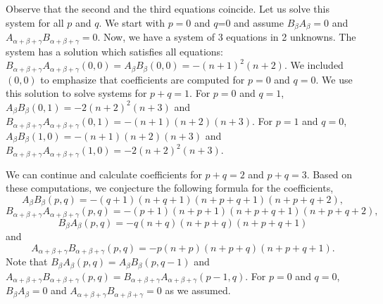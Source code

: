 \documentclass[twoside,a4paper,12pt]{article}
\theoremstyle{definition}
\begin{document}
Observe that the second and the third equations coincide.
Let us solve this system for all $p$ and $q$.
We start with $p=0$ and $q$=0 and assume $B_\beta A_\beta=0$ and
$A_{\alpha+\beta+\gamma}B_{\alpha+\beta+\gamma}=0$. Now, we have a system
of 3 equations in 2 unknowns. The system has a solution which satisfies
all equations:
$B_{\alpha+\beta+\gamma}A_{\alpha+\beta+\gamma}(0,0)=
A_\beta B_\beta(0,0)=-(n+1)^2(n+2)$. We included $(0,0)$ to emphasize
that coefficients are computed for $p=0$ and $q=0$.
We use this solution to solve systems for $p+q=1$. For $p=0$ and $q=1$,
$A_\beta B_\beta(0,1)=-2(n+2)^2(n+3)$ and
$B_{\alpha+\beta+\gamma}A_{\alpha+\beta+\gamma}(0,1)=-(n+1)(n+2)(n+3)$.
For $p=1$ and $q=0$, $A_\beta B_\beta(1,0)=-(n+1)(n+2)(n+3)$ and
$B_{\alpha+\beta+\gamma}A_{\alpha+\beta+\gamma}(1,0)=-2(n+2)^2(n+3)$.

We can continue and calculate coefficients for $p+q=2$ and $p+q=3$. Based on
these computations, we conjecture the following formula for the coefficients,
\begin{equation}\label{abbpq}
	A_\beta B_\beta(p,q)=-(q+1)(n+q+1)(n+p+q+1)(n+p+q+2),
\end{equation}
\begin{equation}\label{baabcpq}
	B_{\alpha+\beta+\gamma}A_{\alpha+\beta+\gamma}(p,q)=
	-(p+1)(n+p+1)(n+p+q+1)(n+p+q+2),
\end{equation}
\begin{equation}\label{babpq}
	B_\beta A_\beta(p,q)=-q(n+q)(n+p+q)(n+p+q+1)
\end{equation}
and
\begin{equation}\label{ababcpq}
	A_{\alpha+\beta+\gamma}B_{\alpha+\beta+\gamma}(p,q)=-p(n+p)(n+p+q)(n+p+q+1).
\end{equation}
Note that $B_\beta A_\beta(p,q)=A_\beta B_\beta(p,q-1)$ and
$A_{\alpha+\beta+\gamma}B_{\alpha+\beta+\gamma}(p,q)=
B_{\alpha+\beta+\gamma}A_{\alpha+\beta+\gamma}(p-1,q)$.
For $p=0$ and $q=0$, $B_\beta A_\beta=0$ and
$A_{\alpha+\beta+\gamma}B_{\alpha+\beta+\gamma}=0$ as we assumed.
\end{document}
